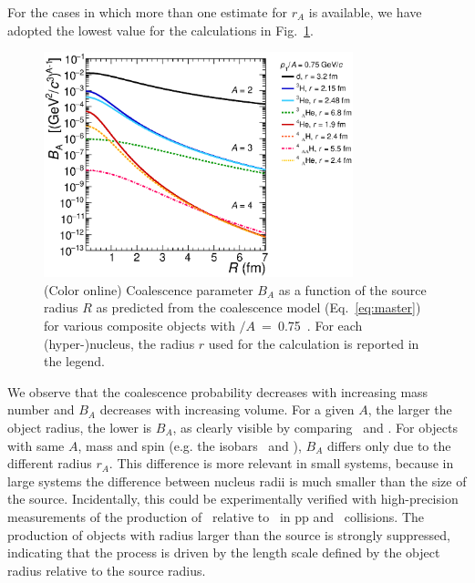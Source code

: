 \documentclass[a4paper,11pt]{article}
\begin{document}
For the cases in which more than one estimate for $r_A$ is available, we have adopted the lowest value for the calculations in Fig.~\ref{Fig:BA}.
%
%
\begin{figure}[htb]
\begin{center}
\includegraphics[width=0.8\textwidth]{coalescenceBA075.eps}
\caption{(Color online) Coalescence parameter $B_A$ as a function of the source radius $R$ as predicted from the coalescence model (Eq.~\ref{eq:master}) for various composite objects with \pt$/A$~=~0.75~\GeVc. For each (hyper-)nucleus, the radius $r$ used for the calculation is reported in the legend.}
\label{Fig:BA}
\end{center}
\end{figure} 
%
%
We observe that the coalescence probability decreases with increasing mass number and $B_A$ decreases with increasing volume. 
For a given $A$, the larger the object radius, the lower is $B_A$, as clearly visible by comparing \hethree~and \hthreelambda. 
For objects with same $A$, mass and spin (e.g. the isobars \tritium~and \hethree), $B_A$ differs only due to the different radius $r_A$. 
This difference is more relevant in small systems, because in large systems the difference between nucleus radii is much smaller than the size of the source.  
Incidentally, this could be experimentally verified with high-precision measurements of the production of \tritium~relative to \hethree~in pp and \pPb~collisions. 
The production of objects with radius larger than the source is strongly suppressed, indicating that the process is driven by the length scale defined by the object radius relative to the source radius.
\end{document}
